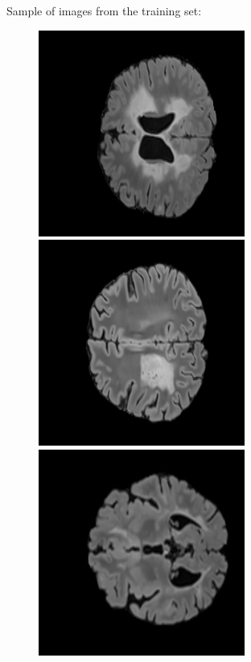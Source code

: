 \newpage
Sample of images from the training set:
\begin{figure}[!htb]
    \includegraphics[width=.32\textwidth]{images/tr_images/tr175_input.jpg}\hfill
    \includegraphics[width=.32\textwidth]{images/tr_images/tr943_input.jpg}\hfill
    \includegraphics[width=.32\textwidth]{images/tr_images/tr1426_input.jpg}
    \hfill
    \hfill

\end{figure}
